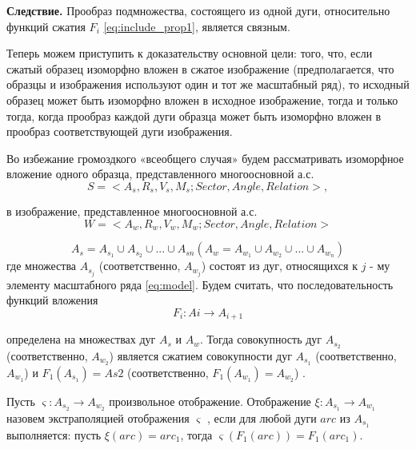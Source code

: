 \textbf{Следствие.}
Прообраз  подмножества, состоящего из одной дуги, относительно функций сжатия  $F_i$ \ref{eq:include_prop1}, является связным.

Теперь можем приступить  к доказательству основной цели: того, что, если сжатый образец изоморфно вложен в сжатое изображение (предполагается, что образцы и изображения используют один и тот же масштабный ряд), то исходный  образец может быть изоморфно вложен в исходное изображение, тогда и только тогда, когда прообраз каждой дуги образца может быть изоморфно вложен в прообраз соответствующей дуги изображения.

Во избежание громоздкого «всеобщего случая» будем рассматривать изоморфное вложение одного образца, представленного многоосновной  а.с.  
\begin{equation}
S  = < A_s, R_s, V_s, M_s; Sector, Angle, Relation >,                     %
\label{scale:9}
\end{equation}
          
в изображение,  представленное многоосновной а.с.  
\begin{equation}
W  = < A_w, R_w, V_w, M_w; Sector,  Angle, Relation >                     %
\label{scale:10}
\end{equation}

\begin{equation}
A_s = A_{s_1} \cup A_{s_2} \cup ... \cup A_{sn}  (A_w = A_{w_1} \cup A_{w_2} \cup ... \cup A_{w_n})                     %
\label{scale:11}
\end{equation}
где  множества   $A_{s_j}$ (соответственно,  $A_{w_j}$) состоят из дуг, относящихся к $j$ - му элементу   масштабного ряда \ref{eq:model}. 
Будем считать, что последовательность функций вложения  
\begin{equation}
F_i : Ai \to A_{i+1}  %
\label{scale:12}
\end{equation}

определена на множествах дуг $A_s$  и $A_w$.  Тогда совокупность дуг $A_{s_2}$ (соответственно,  $A_{w_2}$) является  сжатием   совокупности дуг   $A_{s_1}$ (соответственно,  $A_{w_1}$)    и  $F_1 ( A_{s_1})  =  As2$ (соответственно,  $F_1 ( A_{w_1} )  =  A_{w_2}$) .  

\begin{definition}
Пусть $\varsigma : A_{s_2} \to A_{w_2}$  произвольное отображение. Отображение $\xi : A_{s_1} \to A_{w_1}$ назовем экстраполяцией отображения $\varsigma$ , если для любой дуги   $arc$  из $A_{s_1}$ выполняется:  пусть $\xi(arc)  =  arc_1$,   тогда  $\varsigma (F_1(arc) )  =  F_1(arc_1)$. 
\end{definition}
          
